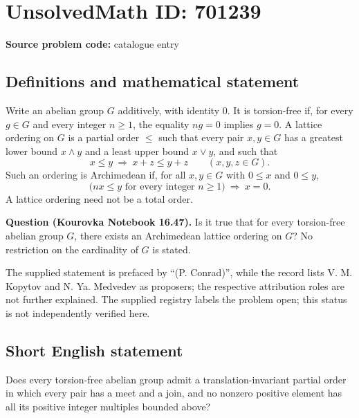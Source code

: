 \documentclass[11pt]{article}
\begin{document}
\section*{UnsolvedMath ID: 701239}
\textbf{Source problem code:} catalogue entry
\subsection{Definitions and mathematical statement}
Write an abelian group \(G\) additively, with identity \(0\). It is torsion-free if, for every \(g\in G\) and every integer \(n\geq 1\), the equality \(ng=0\) implies \(g=0\). A lattice ordering on \(G\) is a partial order \(\leq\) such that every pair \(x,y\in G\) has a greatest lower bound \(x\wedge y\) and a least upper bound \(x\vee y\), and such that
\[
 x\leq y\ \Longrightarrow\ x+z\leq y+z
 \qquad(x,y,z\in G).
\]
Such an ordering is Archimedean if, for all \(x,y\in G\) with \(0\leq x\) and \(0\leq y\),
\[
 \bigl(nx\leq y\text{ for every integer }n\geq 1\bigr)
 \ \Longrightarrow\ x=0.
\]
A lattice ordering need not be a total order.

\textbf{Question (Kourovka Notebook 16.47).} Is it true that for every torsion-free abelian group \(G\), there exists an Archimedean lattice ordering on \(G\)? No restriction on the cardinality of \(G\) is stated.

The supplied statement is prefaced by ``(P. Conrad)'', while the record lists V. M. Kopytov and N. Ya. Medvedev as proposers; the respective attribution roles are not further explained. The supplied registry labels the problem open; this status is not independently verified here.
\subsection{Short English statement}
Does every torsion-free abelian group admit a translation-invariant partial order in which every pair has a meet and a join, and no nonzero positive element has all its positive integer multiples bounded above?
\end{document}
